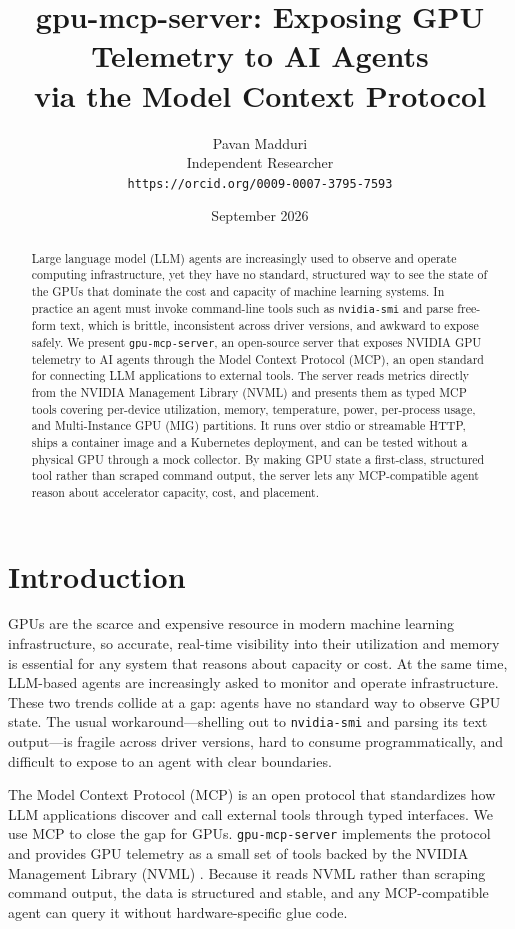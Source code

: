 \documentclass[11pt]{article}
\title{gpu-mcp-server: Exposing GPU Telemetry to AI Agents\\
via the Model Context Protocol}
\author{Pavan Madduri\\
Independent Researcher\\
\texttt{https://orcid.org/0009-0007-3795-7593}}
\date{September 2026}
\begin{document}
\maketitle

\begin{abstract}
Large language model (LLM) agents are increasingly used to observe and operate
computing infrastructure, yet they have no standard, structured way to see the
state of the GPUs that dominate the cost and capacity of machine learning
systems. In practice an agent must invoke command-line tools such as
\texttt{nvidia-smi} and parse free-form text, which is brittle, inconsistent
across driver versions, and awkward to expose safely. We present
\texttt{gpu-mcp-server}, an open-source server that exposes NVIDIA GPU telemetry
to AI agents through the Model Context Protocol (MCP), an open standard for
connecting LLM applications to external tools. The server reads metrics directly
from the NVIDIA Management Library (NVML) and presents them as typed MCP tools
covering per-device utilization, memory, temperature, power, per-process usage,
and Multi-Instance GPU (MIG) partitions. It runs over stdio or streamable HTTP,
ships a container image and a Kubernetes deployment, and can be tested without a
physical GPU through a mock collector. By making GPU state a first-class,
structured tool rather than scraped command output, the server lets any
MCP-compatible agent reason about accelerator capacity, cost, and placement.
\end{abstract}

\section{Introduction}

GPUs are the scarce and expensive resource in modern machine learning
infrastructure, so accurate, real-time visibility into their utilization and
memory is essential for any system that reasons about capacity or cost. At the
same time, LLM-based agents are increasingly asked to monitor and operate
infrastructure. These two trends collide at a gap: agents have no standard way to
observe GPU state. The usual workaround---shelling out to \texttt{nvidia-smi} and
parsing its text output---is fragile across driver versions, hard to consume
programmatically, and difficult to expose to an agent with clear boundaries.

The Model Context Protocol (MCP) \cite{mcp} is an open protocol that standardizes
how LLM applications discover and call external tools through typed interfaces.
We use MCP to close the gap for GPUs. \texttt{gpu-mcp-server} \cite{gms}
implements the protocol and provides GPU telemetry as a small set of tools backed
by the NVIDIA Management Library (NVML) \cite{nvml}. Because it reads NVML rather
than scraping command output, the data is structured and stable, and any
MCP-compatible agent can query it without hardware-specific glue code.
\end{document}
